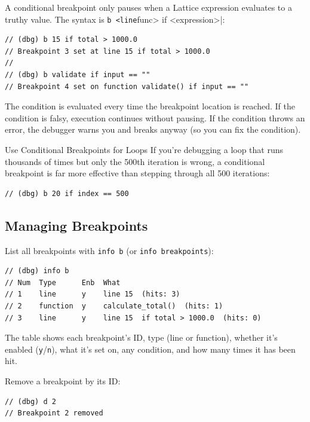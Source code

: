 A conditional breakpoint only pauses when a Lattice expression evaluates to a truthy value.
The syntax is \lstinline|b <line|func> if <expression>|:

\begin{lstlisting}[language=Lattice, caption={Setting conditional breakpoints}]
// (dbg) b 15 if total > 1000.0
// Breakpoint 3 set at line 15 if total > 1000.0
//
// (dbg) b validate if input == ""
// Breakpoint 4 set on function validate() if input == ""
\end{lstlisting}

The condition is evaluated every time the breakpoint location is reached.
If the condition is falsy, execution continues without pausing.
If the condition throws an error, the debugger warns you and breaks anyway (so you can fix the condition).

\begin{tipbox}{Use Conditional Breakpoints for Loops}
If you're debugging a loop that runs thousands of times but only the 500th iteration is wrong, a conditional breakpoint is far more effective than stepping through all 500 iterations:
\begin{lstlisting}[language=Lattice]
// (dbg) b 20 if index == 500
\end{lstlisting}
\end{tipbox}

\subsection{Managing Breakpoints}\label{sec:bp-manage}

List all breakpoints with \lstinline|info b| (or \lstinline|info breakpoints|):

\begin{lstlisting}[language=Lattice, caption={Listing breakpoints}]
// (dbg) info b
// Num  Type      Enb  What
// 1    line      y    line 15  (hits: 3)
// 2    function  y    calculate_total()  (hits: 1)
// 3    line      y    line 15  if total > 1000.0  (hits: 0)
\end{lstlisting}

The table shows each breakpoint's ID, type (line or function), whether it's enabled (\lstinline|y|/\lstinline|n|), what it's set on, any condition, and how many times it has been hit.

Remove a breakpoint by its ID:

\begin{lstlisting}[language=Lattice, caption={Deleting a breakpoint}]
// (dbg) d 2
// Breakpoint 2 removed
\end{lstlisting}

